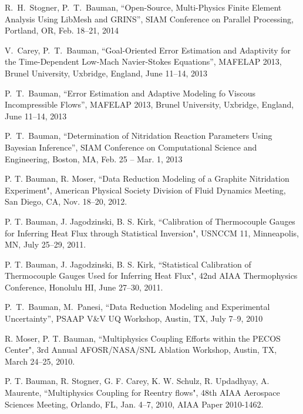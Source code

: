 R.~H.~Stogner, P.~T.~Bauman,
``Open-Source, Multi-Physics Finite Element Analysis Using LibMesh and GRINS'',
SIAM Conference on Parallel Processing, Portland, OR, Feb. 18--21, 2014

\blankline

V.~Carey, P.~T.~Bauman,
``Goal-Oriented Error Estimation and Adaptivity for the Time-Dependent Low-Mach Navier-Stokes Equations'',
MAFELAP 2013, Brunel University, Uxbridge, England, June 11--14, 2013

\blankline

P.~T.~Bauman,
``Error Estimation and Adaptive Modeling fo Viscous Incompressible Flows'',
MAFELAP 2013, Brunel University, Uxbridge, England, June 11--14, 2013

\blankline

P.~T.~Bauman,
``Determination of Nitridation Reaction Parameters Using Bayesian Inference'',
SIAM Conference on Computational Science and Engineering, Boston, MA, Feb. 25 -- Mar. 1, 2013

\blankline

P. T. Bauman, R. Moser,
``Data Reduction Modeling of a Graphite Nitridation Experiment", 
American Physical Society Division of Fluid Dynamics Meeting, San Diego, CA, Nov. 18--20, 2012.

\blankline

P. T. Bauman,  J. Jagodzinski, B. S. Kirk,
``Calibration of Thermocouple Gauges for Inferring Heat Flux through Statistical Inversion", USNCCM 11,
Minneapolis, MN, July 25--29, 2011.

\blankline

P. T. Bauman, J. Jagodzinski, B. S. Kirk,
``Statistical Calibration of Thermocouple Gauges Used for Inferring Heat Flux", 42nd AIAA Thermophysics
Conference, Honolulu HI, June 27--30, 2011.

\blankline

P.~T.~Bauman, M.~Panesi,
``Data Reduction Modeling and Experimental Uncertainty'',
PSAAP V\&V UQ Workshop, Austin, TX, July 7--9, 2010

\blankline


R. Moser, P. T. Bauman,
``Multiphysics Coupling Efforts within the PECOS Center", 
3rd Annual AFOSR/NASA/SNL Ablation Workshop, Austin, TX, March 24--25, 2010.

\blankline

P. T. Bauman, R. Stogner, G. F. Carey, K. W. Schulz, R. Updadhyay, A. Maurente,
``Multiphysics Coupling for Reentry flows",
48th AIAA Aerospace Sciences Meeting, Orlando, FL,  Jan. 4--7, 2010, AIAA Paper 2010-1462.

